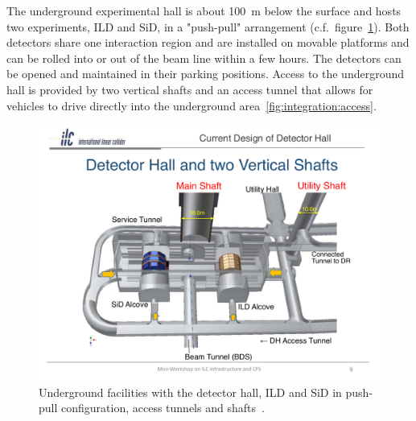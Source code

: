 The underground experimental hall is about 100~m below the surface and hosts two experiments, ILD and SiD, in a "push-pull" arrangement (c.f.~figure~\ref{fig:integration:underground}). Both detectors share one interaction region and are installed on movable platforms and can be rolled into or out of the beam line within a few hours. The detectors can be opened and maintained in their parking positions. Access to the underground hall is provided by two vertical shafts and an access tunnel that allows for vehicles to drive directly into the underground area~\ref{fig:integration:access}.

\begin{figure}[h!]
\includegraphics[width=1.0\hsize]{Integration/fig/Underground_Facilities.pdf}
\caption{\label{fig:integration:underground}Underground facilities with the detector hall, ILD and SiD in push-pull configuration, access tunnels and shafts~\cite{ild:bib:underground_facilities}. }
\end{figure}


